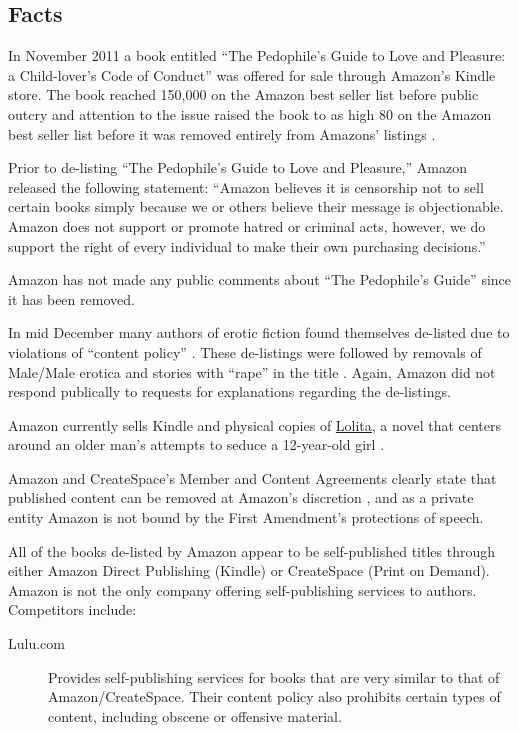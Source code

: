 \documentclass[11pt]{article}
\begin{document}
\begin{multicols}{2}
\setcounter{page}{1}

\section{Facts}

In November 2011 a book entitled ``The Pedophile's Guide to Love and Pleasure: a Child-lover's Code of Conduct'' was offered for sale through Amazon's Kindle store.  The book reached 150,000 on the Amazon best seller list \cite{TechCrunchAmazonCensorship} before public outcry and attention to the issue raised the book to as high 80 on the Amazon best seller list before it was removed entirely from Amazons' listings \cite{TechCrunchAmazonPedophilia}.

Prior to de-listing ``The Pedophile's Guide to Love and Pleasure,'' Amazon released the following statement: ``Amazon believes it is censorship not to sell certain books simply because we or others believe their message is objectionable.  Amazon does not support or promote hatred or criminal acts, however, we do support the right of every individual to make their own purchasing decisions.'' \cite{TechCrunchAmazonCensorship}

Amazon has not made any public comments about ``The Pedophile's Guide'' since it has been removed.

In mid December many authors of erotic fiction found themselves de-listed due to violations of ``content policy'' \cite{KittSelfPubRevolution}.  These de-listings were followed by removals of Male/Male erotica and stories with ``rape'' in the title \cite{jamthecat}.  Again, Amazon did not respond publically to requests for explanations regarding the de-listings.  

Amazon currently sells Kindle and physical copies of \underline{Lolita}, a novel that centers around an older man's attempts to seduce a 12-year-old girl \cite{AmazonLolitaDTPListing}.

Amazon and CreateSpace's Member and Content Agreements clearly state that published content can be removed at Amazon's discretion \cite{CreateSpaceMemberAgreement,CreateSpaceContentGuidelines,AmazonKDPContentGuidelines}, and as a private entity Amazon is not bound by the First Amendment's protections of speech. 

All of the books de-listed by Amazon appear to be self-published titles through either Amazon Direct Publishing (Kindle) or CreateSpace (Print on Demand).  Amazon is not the only company offering self-publishing services to authors. Competitors include:
   \begin{description}
   \item[Lulu.com] Provides self-publishing services for books that are very similar to that of Amazon/CreateSpace.  Their content policy also prohibits certain types of content, including obscene or offensive material. \cite{LuluMemberAgreement}


\end{description}
\end{multicols}
\end{document}
